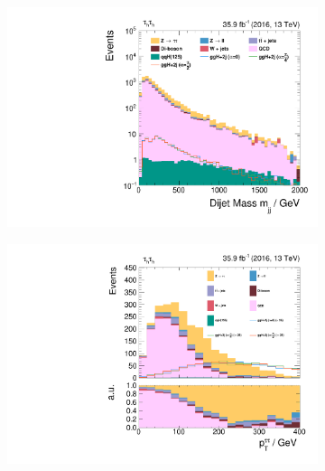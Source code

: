 \begin{figure}[h!]
    \centering
    \begin{subfigure}{.32\textwidth}
        \centering
        \includegraphics[width=\textwidth]{Figures/eventselection/Categorization/tt/mjj.pdf}
    \end{subfigure}%
    \begin{subfigure}{.32\textwidth}
        \centering
        \includegraphics[width=\textwidth]{Figures/eventselection/Categorization/tt/H_pt.pdf}
    \end{subfigure}%
    \begin{subfigure}{.32\textwidth}
        \centering

\end{subfigure}
\end{figure}
